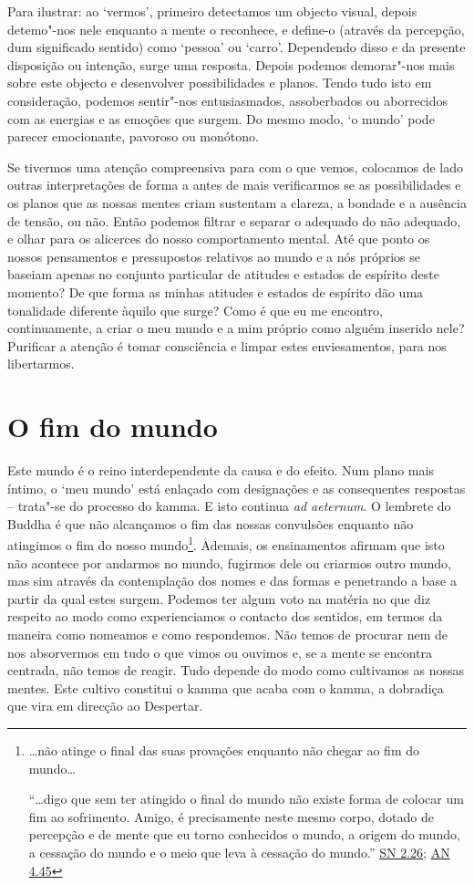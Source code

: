 Para ilustrar: ao `vermos', primeiro detectamos um objecto visual, depois detemo"-nos nele enquanto a mente o reconhece, e define-o (através da percepção, dum significado sentido) como `pessoa' ou `carro'. Dependendo disso e da presente disposição ou intenção, surge uma resposta. Depois podemos demorar"-nos mais sobre este objecto e desenvolver possibilidades e planos. Tendo tudo isto em consideração, podemos sentir"-nos entusiasmados, assoberbados ou aborrecidos com as energias e as emoções que surgem. Do mesmo modo, `o mundo' pode parecer emocionante, pavoroso ou monótono.

Se tivermos uma atenção compreensiva para com o que vemos, colocamos de lado outras interpretações de forma a antes de mais verificarmos se as possibilidades e os planos que as nossas mentes criam sustentam a clareza, a bondade e a ausência de tensão, ou não. Então podemos filtrar e separar o adequado do não adequado, e olhar para os alicerces do nosso comportamento mental. Até que ponto os nossos pensamentos e pressupostos relativos ao mundo e a nós próprios se baseiam apenas no conjunto particular de atitudes e estados de espírito deste momento? De que forma as minhas atitudes e estados de espírito dão uma tonalidade diferente àquilo que surge? Como é que eu me encontro, continuamente, a criar o meu mundo e a mim próprio como alguém inserido nele? Purificar a atenção é tomar consciência e limpar estes enviesamentos, para nos libertarmos.

\section{O fim do mundo}

Este mundo é o reino interdependente da causa e do efeito. Num plano mais íntimo, o `meu mundo' está enlaçado com designações e as consequentes respostas -- trata"-se do processo do kamma. E isto continua \emph{ad aeternum}. O lembrete do Buddha é que não alcançamos o fim das nossas convulsões enquanto não atingimos o fim do nosso mundo\footnote{\ldots não atinge o final das suas provações enquanto não chegar ao fim do mundo\ldots{}

  ``\ldots digo que sem ter atingido o final do mundo não existe forma de colocar um fim ao sofrimento. Amigo, é precisamente neste mesmo corpo, dotado de percepção e de mente que eu torno conhecidos o mundo, a origem do mundo, a cessação do mundo e o meio que leva à cessação do mundo.'' \href{https://suttacentral.net/sn2.26/en/sujato}{SN 2.26}; \href{https://suttacentral.net/an4.45/en/thanissaro}{AN 4.45}}. Ademais, os ensinamentos afirmam que isto não acontece por andarmos no mundo, fugirmos dele ou criarmos outro mundo, mas sim através da contemplação dos nomes e das formas e penetrando a base a partir da qual estes surgem. Podemos ter algum voto na matéria no que diz respeito ao modo como experienciamos o contacto dos sentidos, em termos da maneira como nomeamos e como respondemos. Não temos de procurar nem de nos absorvermos em tudo o que vimos ou ouvimos e, se a mente se encontra centrada, não temos de reagir. Tudo depende do modo como cultivamos as nossas mentes. Este cultivo constitui o kamma que acaba com o kamma, a dobradiça que vira em direcção ao Despertar.

